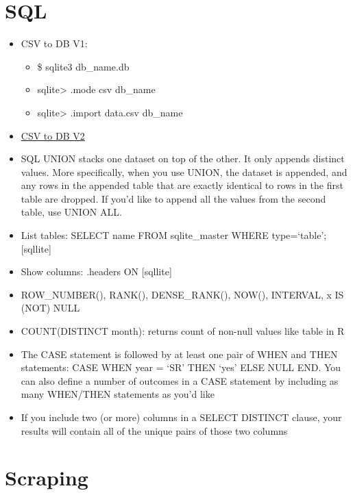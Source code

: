 \documentclass[]{book}
\providecommand{\tightlist}{%
  \setlength{\itemsep}{0pt}\setlength{\parskip}{0pt}}
\theoremstyle{definition}
\theoremstyle{definition}
\theoremstyle{definition}
\theoremstyle{remark}
\begin{document}
\section{SQL}\label{sql}

\begin{itemize}
\item
  CSV to DB V1:

  \begin{itemize}
  \tightlist
  \item
    \$ sqlite3 db\_name.db
  \item
    sqlite\textgreater{} .mode csv db\_name
  \item
    sqlite\textgreater{} .import data.csv db\_name
  \end{itemize}
\item
  \href{https://gist.github.com/gfleetwood/c2ea91da4a8ab1a77f777e28e0b2949c}{CSV
  to DB V2}
\item
  SQL UNION stacks one dataset on top of the other. It only appends
  distinct values. More specifically, when you use UNION, the dataset is
  appended, and any rows in the appended table that are exactly
  identical to rows in the first table are dropped. If you'd like to
  append all the values from the second table, use UNION ALL.
\item
  List tables: SELECT name FROM sqlite\_master WHERE type=`table';
  {[}sqllite{]}
\item
  Show columns: .headers ON {[}sqllite{]}
\item
  ROW\_NUMBER(), RANK(), DENSE\_RANK(), NOW(), INTERVAL, x IS (NOT) NULL
\item
  COUNT(DISTINCT month): returns count of non-null values like table in
  R
\item
  The CASE statement is followed by at least one pair of WHEN and THEN
  statements: CASE WHEN year = `SR' THEN `yes' ELSE NULL END. You can
  also define a number of outcomes in a CASE statement by including as
  many WHEN/THEN statements as you'd like
\item
  If you include two (or more) columns in a SELECT DISTINCT clause, your
  results will contain all of the unique pairs of those two columns
\end{itemize}

\section{Scraping}\label{scraping}
\end{document}
